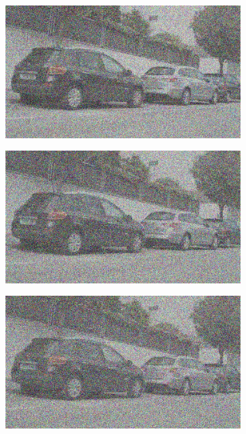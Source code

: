 \documentclass[a4paper]{ctexart}
\begin{document}
\begin{figure}[htbp]
\begin{subfigure}{0.08\textwidth}
				\label{fig：Gamma=1.0, Gauss Noise = 0.7}
			\end{subfigure}
			\begin{subfigure}{0.08\textwidth}
				\captionsetup{font=scriptsize}
				\includegraphics[width=\linewidth]{picture/Edge Detection/degrade/RGB_001 Gamma=1.0, Gauss Noise=0.8}
				\label{fig：Gamma=1.0, Gauss Noise = 0.8}
			\end{subfigure}
			\begin{subfigure}{0.08\textwidth}
				\captionsetup{font=scriptsize}
				\includegraphics[width=\linewidth]{picture/Edge Detection/degrade/RGB_001 Gamma=1.0, Gauss Noise=0.9}
				\label{fig：Gamma=1.0, Gauss Noise = 0.9}
			\end{subfigure}
			\begin{subfigure}{0.08\textwidth}
				\captionsetup{font=scriptsize}
				\includegraphics[width=\linewidth]{picture/Edge Detection/degrade/RGB_001 Gamma=1.0, Gauss Noise=1.0}

\end{subfigure}
\end{figure}
\end{document}
